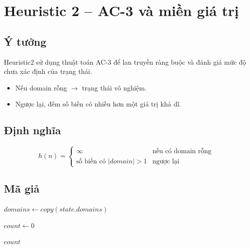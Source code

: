 
\section{Heuristic 2 -- AC-3 và miền giá trị}

\subsection{Ý tưởng}

Heuristic2 sử dụng thuật toán AC-3 để lan truyền ràng buộc và đánh giá mức độ chưa xác định của trạng thái.

\begin{itemize}
    \item Nếu domain rỗng $\rightarrow$ trạng thái vô nghiệm.
    \item Ngược lại, đếm số biến có nhiều hơn một giá trị khả dĩ.
\end{itemize}

\subsection{Định nghĩa}

\[
h(n) =
\begin{cases}
\infty & \text{nếu có domain rỗng} \\
\text{số biến có } |domain| > 1 & \text{ngược lại}
\end{cases}
\]

\subsection{Mã giả}

\begin{algorithm}[H]
\footnotesize
\caption{Heuristic2 cho bài toán}


$domains \leftarrow copy(state.domains)$ \;


$count \leftarrow 0$ \;


\Return $count$ \;

\end{algorithm}

